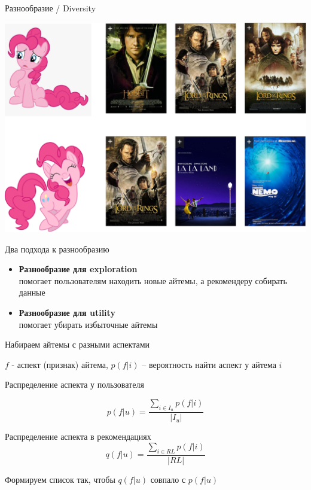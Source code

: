 \documentclass[11pt,aspectratio=169,handout]{beamer}
\begin{document}
\begin{frame}{Разнообразие / Diversity}

\begin{center}
\includegraphics[scale=0.22]{images/diversity.png}
\end{center}

\end{frame}

\begin{frame}{Два подхода к разнообразию}

\begin{itemize}
\item {\bf Разнообразие для exploration} \\
помогает пользователям находить новые айтемы, а рекомендеру собирать данные
\item {\bf Разнообразие для utility} \\
помогает убирать избыточные айтемы
\end{itemize}

\end{frame}

\begin{frame}{Набираем айтемы с разными аспектами}

$f$ - аспект (признак) айтема, $p(f | i)$ -- вероятность найти аспект у айтема $i$

\vfill

Распределение аспекта у пользователя

\[
p(f | u) = \frac{\sum_{i \in I_u} p(f | i)}{|I_u|}  
\]

Распределение аспекта в рекомендациях
\[
q(f | u) = \frac{\sum_{i \in RL} p(f | i)}{|RL|}
\]

\begin{tcolorbox}[colback=info!5,colframe=info!80,title=]
Формируем список так, чтобы $q(f | u)$ совпало с $p(f | u)$
\end{tcolorbox}

\end{frame}
\end{document}
